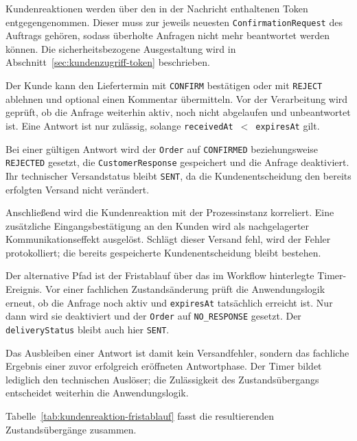 Kundenreaktionen werden über den in der Nachricht enthaltenen Token
entgegengenommen. Dieser muss zur jeweils neuesten
\texttt{ConfirmationRequest} des Auftrags gehören, sodass überholte Anfragen
nicht mehr beantwortet werden können. Die sicherheitsbezogene Ausgestaltung
wird in Abschnitt~\ref{sec:kundenzugriff-token} beschrieben.

Der Kunde kann den Liefertermin mit \texttt{CONFIRM} bestätigen oder mit
\texttt{REJECT} ablehnen und optional einen Kommentar übermitteln. Vor der
Verarbeitung wird geprüft, ob die Anfrage weiterhin aktiv, noch nicht
abgelaufen und unbeantwortet ist. Eine Antwort ist nur zulässig, solange
\texttt{receivedAt}~$<$~\texttt{expiresAt} gilt.

Bei einer gültigen Antwort wird der \texttt{Order} auf
\texttt{CONFIRMED} beziehungsweise \texttt{REJECTED} gesetzt, die
\texttt{CustomerResponse} gespeichert und die Anfrage deaktiviert. Ihr
technischer Versandstatus bleibt \texttt{SENT}, da die Kundenentscheidung den
bereits erfolgten Versand nicht verändert.

Anschließend wird die Kundenreaktion mit der Prozessinstanz korreliert. Eine
zusätzliche Eingangsbestätigung an den Kunden wird als nachgelagerter
Kommunikationseffekt ausgelöst. Schlägt dieser Versand fehl, wird der Fehler
protokolliert; die bereits gespeicherte Kundenentscheidung bleibt bestehen.

Der alternative Pfad ist der Fristablauf über das im Workflow hinterlegte
Timer-Ereignis. Vor einer fachlichen Zustandsänderung prüft die
Anwendungslogik erneut, ob die Anfrage noch aktiv und
\texttt{expiresAt} tatsächlich erreicht ist. Nur dann wird sie deaktiviert und
der \texttt{Order} auf \texttt{NO\_RESPONSE} gesetzt. Der
\texttt{deliveryStatus} bleibt auch hier \texttt{SENT}.

Das Ausbleiben einer Antwort ist damit kein Versandfehler, sondern das
fachliche Ergebnis einer zuvor erfolgreich eröffneten Antwortphase. Der Timer
bildet lediglich den technischen Auslöser; die Zulässigkeit des
Zustandsübergangs entscheidet weiterhin die Anwendungslogik.

Tabelle~\ref{tab:kundenreaktion-fristablauf} fasst die resultierenden
Zustandsübergänge zusammen.

